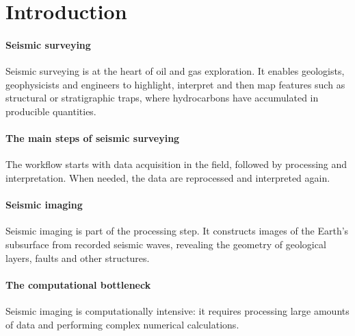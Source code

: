 \documentclass[letterpaper,11pt,leqno]{article}
\begin{document}
\section{Introduction}\label{s:introduction}

\paragraph{Seismic surveying} Seismic surveying is at the heart of oil and gas exploration. It enables geologists, geophysicists and engineers to highlight, interpret and then map features such as structural or stratigraphic traps, where hydrocarbons have accumulated in producible quantities.
\paragraph{The main steps of seismic surveying} The workflow starts with data acquisition in the field, followed by processing and interpretation. When needed, the data are reprocessed and interpreted again.

\begin{center}
\end{center}

\paragraph{Seismic imaging} Seismic imaging is part of the processing step. It constructs images of the Earth's subsurface from recorded seismic waves, revealing the geometry of geological layers, faults and other structures.

 
\paragraph{The computational bottleneck} Seismic imaging is computationally intensive: it requires processing large amounts of data and performing complex numerical calculations.
\end{document}
